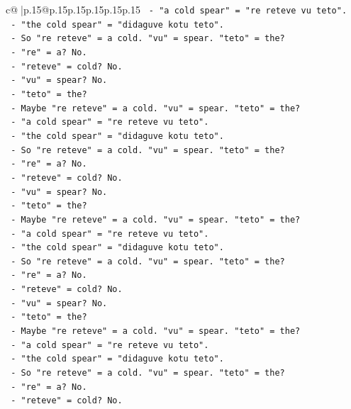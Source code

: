 \documentclass{article}
\begin{document}
{\begin{supertabular}{c@{$\;$}|p{.15\linewidth}@{}p{.15\linewidth}p{.15\linewidth}p{.15\linewidth}p{.15\linewidth}p{.15\linewidth}}
{{{\texttt{   {-} "a cold spear" = "re reteve vu teto".} \\
\texttt{   {-} "the cold spear" = "didaguve kotu teto".} \\
\texttt{   {-} So "re reteve" = a cold. "vu" = spear. "teto" = the?} \\
\texttt{   {-} "re" = a? No.} \\
\texttt{   {-} "reteve" = cold? No.} \\
\texttt{   {-} "vu" = spear? No.} \\
\texttt{   {-} "teto" = the?} \\
\texttt{   {-} Maybe "re reteve" = a cold. "vu" = spear. "teto" = the?} \\
\texttt{   {-} "a cold spear" = "re reteve vu teto".} \\
\texttt{   {-} "the cold spear" = "didaguve kotu teto".} \\
\texttt{   {-} So "re reteve" = a cold. "vu" = spear. "teto" = the?} \\
\texttt{   {-} "re" = a? No.} \\
\texttt{   {-} "reteve" = cold? No.} \\
\texttt{   {-} "vu" = spear? No.} \\
\texttt{   {-} "teto" = the?} \\
\texttt{   {-} Maybe "re reteve" = a cold. "vu" = spear. "teto" = the?} \\
\texttt{   {-} "a cold spear" = "re reteve vu teto".} \\
\texttt{   {-} "the cold spear" = "didaguve kotu teto".} \\
\texttt{   {-} So "re reteve" = a cold. "vu" = spear. "teto" = the?} \\
\texttt{   {-} "re" = a? No.} \\
\texttt{   {-} "reteve" = cold? No.} \\
\texttt{   {-} "vu" = spear? No.} \\
\texttt{   {-} "teto" = the?} \\
\texttt{   {-} Maybe "re reteve" = a cold. "vu" = spear. "teto" = the?} \\
\texttt{   {-} "a cold spear" = "re reteve vu teto".} \\
\texttt{   {-} "the cold spear" = "didaguve kotu teto".} \\
\texttt{   {-} So "re reteve" = a cold. "vu" = spear. "teto" = the?} \\
\texttt{   {-} "re" = a? No.} \\
\texttt{   {-} "reteve" = cold? No.} \\
}}}
\end{supertabular}}
\end{document}
